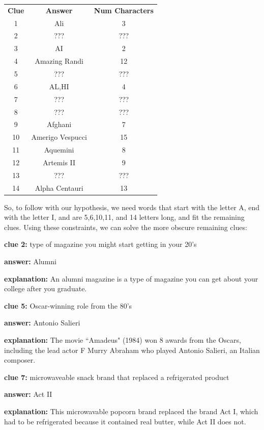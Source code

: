 \documentclass{article}
\begin{document}
\begin{tabular}{ c c c }
 \textbf{Clue} & \textbf{Answer} & \textbf{Num Characters} \\ 
 1 & Ali &  3\\  
 2 & ??? &  ???\\
 3 & AI &  2\\
 4 & Amazing Randi &  12\\
 5 & ??? &  ???\\
 6 & AL,HI &  4\\
 7 & ??? &  ???\\
 8 & ??? &  ???\\
 9 & Afghani &  7\\
 10 & Amerigo Vespucci &  15\\
 11 & Aquemini &  8\\
 12 & Artemis II &  9\\
 13 & ??? &  ???\\
 14 & Alpha Centauri & 13   
\end{tabular}

\quad

\quad

So, to follow with our hypothesis, we need words that start with the letter A, end with the letter I, and are 5,6,10,11, and 14 letters long, and fit the remaining clues. Using these constraints, we can solve the more obscure remaining clues:

\quad

\textbf{clue 2: } type of magazine you might start getting in your 20's

\quad\textbf{answer:} Alumni

\quad\textbf{explanation:} An alumni magazine is a type of magazine you can get about your college after you graduate.

\quad

\textbf{clue 5: } Oscar-winning role from the 80's

\quad\textbf{answer:} Antonio Salieri

\quad\textbf{explanation:} The movie ``Amadeus" (1984) won 8 awards from the Oscars, including the lead actor F Murry Abraham who played Antonio Salieri, an Italian composer. 

\quad


\textbf{clue 7: } microwaveable snack brand that replaced a refrigerated product

\quad\textbf{answer:} Act II

\quad\textbf{explanation:} This microwavable popcorn brand replaced the brand Act I, which had to be refrigerated because it contained real butter, while Act II does not.
\end{document}
